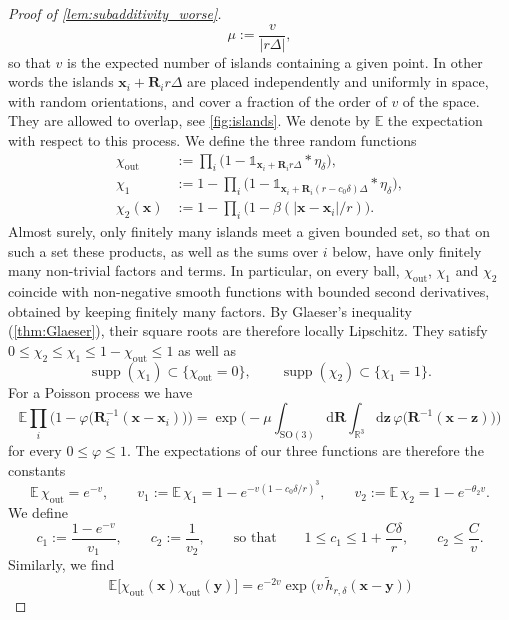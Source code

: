 \documentclass[final,reqno]{amsart}
\theoremstyle{remark}
\renewcommand{\le}{\leqslant}
\let\phi=\varphi
\newcommand{\wt}[1]{\widetilde{#1}}
\DeclareMathOperator{\supp}{supp}
\newcommand{\RR}{\mathbb{R}}
\newcommand{\EE}{\mathbb{E}}
\newcommand{\SO}{\mathrm{SO}}
\newcommand{\iden}{\mathbb{1}}
\newcommand{\tetra}{\mathbb{\Delta}}
\newcommand{\dd}{\mathrm{d}}
\begin{document}
\begin{proof}[Proof of \cref{lem:subadditivity_worse}]
$$
\mu:=\frac{v}{|r\tetra|},
$$
so that $v$ is the expected number of islands containing a given point. In other words the islands $\mathbf{x}_i+\mathbf{R}_ir\tetra$ are placed independently and uniformly in space, with random orientations, and cover a fraction of the order of $v$ of the space. They are allowed to overlap, see \cref{fig:islands}. We denote by $\EE$ the expectation with respect to this process. We define the three random functions
\begin{align*}
\chi_{\mathrm{out}}&:=\prod_i\big(1-\iden_{\mathbf{x}_i+\mathbf{R}_ir\tetra}\ast\eta_\delta\big),\\
\chi_1&:=1-\prod_i\big(1-\iden_{\mathbf{x}_i+\mathbf{R}_i(r-c_0\delta)\tetra}\ast\eta_\delta\big),\\
\chi_2(\mathbf{x})&:=1-\prod_i\big(1-\beta(|\mathbf{x}-\mathbf{x}_i|/r)\big).
\end{align*}
Almost surely, only finitely many islands meet a given bounded set, so that on such a set these products, as well as the sums over $i$ below, have only finitely many non-trivial factors and terms. In particular, on every ball, $\chi_{\mathrm{out}}$, $\chi_1$ and $\chi_2$ coincide with non-negative smooth functions with bounded second derivatives, obtained by keeping finitely many factors. By Glaeser's inequality (\cref{thm:Glaeser}), their square roots are therefore locally Lipschitz. They satisfy $0\le\chi_2\le\chi_1\le1-\chi_{\mathrm{out}}\le1$ as well as
\begin{equation}\label{eq:supports_islands}
\supp(\chi_1)\subset\{\chi_{\mathrm{out}}=0\},\qquad \supp(\chi_2)\subset\{\chi_1=1\}.
\end{equation}
For a Poisson process we have
$$
\EE\prod_i\Big(1-\phi\big(\mathbf{R}_i^{-1}(\mathbf{x}-\mathbf{x}_i)\big)\Big)=\exp\Big(-\mu\int_{\SO(3)}\dd\mathbf{R}\int_{\RR^3}\dd\mathbf{z}\,\phi\big(\mathbf{R}^{-1}(\mathbf{x}-\mathbf{z})\big)\Big)
$$
for every $0\le\phi\le1$. The expectations of our three functions are therefore the constants
$$
\EE\,\chi_{\mathrm{out}}=e^{-v},\qquad v_1:=\EE\,\chi_1=1-e^{-v(1-c_0\delta/r)^3},\qquad v_2:=\EE\,\chi_2=1-e^{-\theta_2v}.
$$
We define
$$
c_1:=\frac{1-e^{-v}}{v_1},\qquad c_2:=\frac1{v_2},\qquad\text{so that}\qquad 1\le c_1\le1+\frac{C\delta}{r},\qquad c_2\le\frac{C}{v}.
$$
Similarly, we find
\begin{equation}\label{eq:correlation_out}
\EE\big[\chi_{\mathrm{out}}(\mathbf{x})\chi_{\mathrm{out}}(\mathbf{y})\big]=e^{-2v}\exp\big(v\,\wt{h}_{r,\delta}(\mathbf{x}-\mathbf{y})\big)
\end{equation}

\end{proof}
\end{document}
